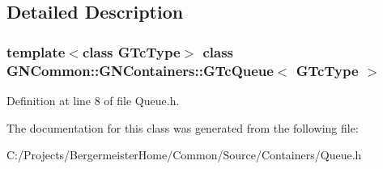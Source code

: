 \subsection{Detailed Description}
\subsubsection*{template$<$class G\+Tc\+Type$>$\newline
class G\+N\+Common\+::\+G\+N\+Containers\+::\+G\+Tc\+Queue$<$ G\+Tc\+Type $>$}



Definition at line 8 of file Queue.\+h.



The documentation for this class was generated from the following file\+:\begin{DoxyCompactItemize}
\item 
C\+:/\+Projects/\+Bergermeister\+Home/\+Common/\+Source/\+Containers/Queue.\+h\end{DoxyCompactItemize}
